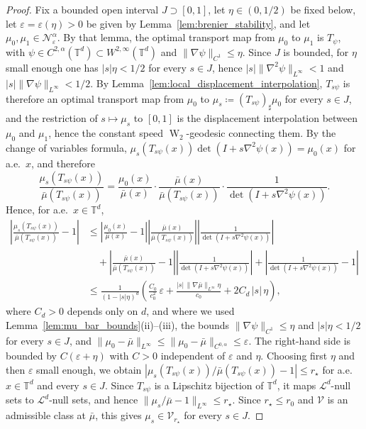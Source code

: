 \documentclass[11pt]{article}
\numberwithin{equation}{section}
\theoremstyle{definition}
\newcommand{\T}{\mathbb{T}}
\newcommand{\Wtwo}{\operatorname{W}_2}
\newcommand{\Nbhd}{\mathcal{N}}
\begin{document}
\begin{proof}
    Fix a bounded open interval $J \supset [0,1]$, let $\eta \in (0, 1/2)$ be fixed below, let $\varepsilon = \varepsilon(\eta) > 0$ be given by Lemma~\ref{lem:brenier_stability}, and let $\mu_0, \mu_1 \in \Nbhd^\alpha_{\varepsilon}$.
    By that lemma, the optimal transport map from $\mu_0$ to $\mu_1$ is $T_\psi$, with $\psi \in C^{2,\alpha}(\T^d) \subset W^{2,\infty}(\T^d)$ and $\|\nabla\psi\|_{C^1} \le \eta$.
    Since $J$ is bounded, for $\eta$ small enough one has $|s| \eta < 1/2$ for every $s \in J$, hence $|s| \|\nabla^2\psi\|_{L^\infty} < 1$ and $|s| \|\nabla\psi\|_{L^\infty} < 1/2$.
    By Lemma~\ref{lem:local_displacement_interpolation}, $T_{s\psi}$ is therefore an optimal transport map from $\mu_0$ to $\mu_s \coloneqq (T_{s\psi})_\sharp\mu_0$ for every $s \in J$, and the restriction of $s \mapsto \mu_s$ to $[0,1]$ is the displacement interpolation between $\mu_0$ and $\mu_1$, hence the constant speed $\Wtwo$-geodesic connecting them.
    By the change of variables formula, $\mu_s(T_{s\psi}(x)) \det(I + s\nabla^2\psi(x)) = \mu_0(x)$ for a.e.\ $x$, and therefore
    \[
    \frac{\mu_s(T_{s\psi}(x))}{\bar\mu(T_{s\psi}(x))} = \frac{\mu_0(x)}{\bar\mu(x)} \cdot \frac{\bar\mu(x)}{\bar\mu(T_{s\psi}(x))} \cdot \frac{1}{\det(I + s\nabla^2\psi(x))}.
    \]
    Hence, for a.e.\ $x \in \T^d$,
    \[
    \begin{split}
        \left|\frac{\mu_s(T_{s\psi}(x))}{\bar\mu(T_{s\psi}(x))} - 1\right| &\le \left|\frac{\mu_0(x)}{\bar\mu(x)} - 1\right| \left|\frac{\bar\mu(x)}{\bar\mu(T_{s\psi}(x))}\right| \left|\frac{1}{\det(I + s\nabla^2\psi(x))}\right| \\
        &\quad + \left|\frac{\bar\mu(x)}{\bar\mu(T_{s\psi}(x))} - 1\right| \left|\frac{1}{\det(I + s\nabla^2\psi(x))}\right| + \left|\frac{1}{\det(I + s\nabla^2\psi(x))} - 1\right| \\
        &\le \frac{1}{(1 - |s|\eta)^d} \left(\frac{C_0}{c_0^2}\,\varepsilon + \frac{|s|\,\|\nabla \bar\mu\|_{L^\infty} \eta}{c_0} + 2C_d\,|s|\,\eta \right),
    \end{split}
    \]
    where $C_d > 0$ depends only on $d$, and where we used Lemma~\ref{lem:mu_bar_bounds}(ii)--(iii), the bounds $\|\nabla\psi\|_{C^1} \le \eta$ and $|s|\eta < 1/2$ for every $s \in J$, and $\|\mu_0 - \bar\mu\|_{L^\infty} \le \|\mu_0 - \bar\mu\|_{C^{0,\alpha}} \le \varepsilon$.
    The right-hand side is bounded by $C(\varepsilon + \eta)$ with $C > 0$ independent of $\varepsilon$ and $\eta$.
    Choosing first $\eta$ and then $\varepsilon$ small enough, we obtain $|\mu_s(T_{s\psi}(x)) / \bar\mu(T_{s\psi}(x)) - 1| \le r_\star$ for a.e.\ $x \in \T^d$ and every $s \in J$.
    Since $T_{s\psi}$ is a Lipschitz bijection of $\T^d$, it maps $\mathcal{L}^d$-null sets to $\mathcal{L}^d$-null sets, and hence $\|\mu_s/\bar\mu - 1\|_{L^\infty} \le r_\star$.
    Since $r_\star \le r_0$ and $\mathcal{V}$ is an admissible class at $\bar\mu$, this gives $\mu_s \in \mathcal{V}_{r_\star}$ for every $s \in J$.




\end{proof}
\end{document}
